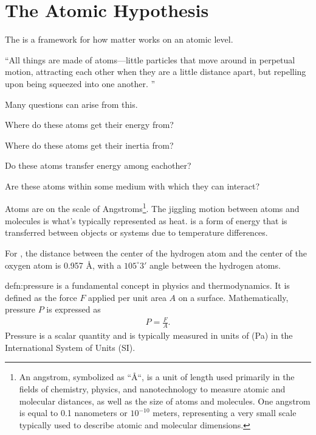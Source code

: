 \section{The Atomic Hypothesis\label{section:The Atomic Hypothesis}}

The  is a framework for how matter works on an atomic level.

\begin{quotationbox}
	``All things are made of atoms—little particles that move around in perpetual motion, attracting each other when they are a little distance apart, but repelling upon being squeezed into one another. \cite{bib:feynman lectures}''
\end{quotationbox}

Many questions can arise from this.

\begin{questions}
	\item Where do these atoms get their energy from?
	\item Where do these atoms get their inertia from?
	\item Do these atoms transfer energy among eachother?
	\item Are these atoms within some medium with which they can interact?
\end{questions}

Atoms are on the scale of Angstroms\footnote{An angstrom, symbolized as ``\AA``, is a unit of length used primarily in the fields of chemistry, physics, and nanotechnology to measure atomic and molecular distances, as well as the size of atoms and molecules. One angstrom is equal to 0.1 nanometers or $10^{-10}$ meters, representing a very small scale typically used to describe atomic and molecular dimensions.}. The jiggling motion between atoms and molecules is what's typically represented as heat.  is a form of energy that is transferred between objects or systems due to temperature differences.

\begin{interestnote}
	For , the distance between the center of the hydrogen atom and the center of the oxygen atom is 0.957 \AA, with a $105^\circ3'$ angle between the hydrogen atoms.
\end{interestnote}

\begin{defn}[Pressure]{defn:pressure}
	 is a fundamental concept in physics and thermodynamics. It is defined as the force $F$ applied per unit area $A$ on a surface. Mathematically, pressure $P$ is expressed as 
	\begin{align}
		P=\frac{F}{A}.
	\end{align}
	Pressure is a scalar quantity and is typically measured in units of  (Pa) in the International System of Units (SI). 
\end{defn}

